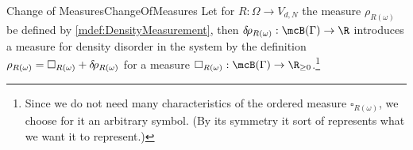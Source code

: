 \begin{mdef}{Change of Measures}{ChangeOfMeasures}
    Let for $R:\Omega\to V_{d,N}$ the measure $\rho_{R(\omega)}$ be defined by \ref{mdef:DensityMeasurement}, then $\drho_{R(\omega)}:\mcB(\Gamma)\to\R$ introduces a measure for density disorder in the system by the definition $\rho_{R(\omega)} = \square_{R(\omega)} + \delta\hspace*{-0.15em}\rho_{R(\omega)}$ for a measure $\square_{R(\omega)}:\mcB(\Gamma)\to\R_{\geq 0}$.\footnote{Since we do not need many characteristics of the ordered measure $\square_{R(\omega)}$, we choose for it an arbitrary symbol. (By its symmetry it sort of represents what we want it to represent.)}
\end{mdef}